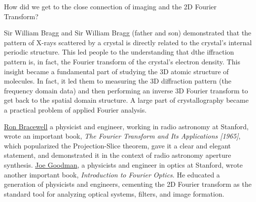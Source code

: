 \documentclass[
  letterpaper,
]{book}
\begin{document}
\begin{tcolorbox}[enhanced jigsaw, colframe=quarto-callout-note-color-frame, titlerule=0mm, rightrule=.15mm, opacitybacktitle=0.6, colback=white, leftrule=.75mm, coltitle=black, title=\textcolor{quarto-callout-note-color}{\faInfo}\hspace{0.5em}{2D Fourier Transforms}, bottomrule=.15mm, colbacktitle=quarto-callout-note-color!10!white, breakable, left=2mm, bottomtitle=1mm, toptitle=1mm, opacityback=0, arc=.35mm, toprule=.15mm]

How did we get to the close connection of imaging and the 2D Fourier
Transform?

Sir William Bragg and Sir William Bragg (father and son) demonstrated
that the pattern of X-rays scattered by a crystal is directly related to
the crystal's internal periodic structure. This led people to the
understanding that dthe iffraction pattern is, in fact, the Fourier
transform of the crystal's electron density. This insight became a
fundamental part of studying the 3D atomic structure of molecules. In
fact, it led them to measuring the 3D diffraction pattern (the frequency
domain data) and then performing an inverse 3D Fourier transform to get
back to the spatial domain structure. A large part of crystallography
became a practical problem of applied Fourier analysis.

\href{https://trees.stanford.edu/bracewell.htm}{Ron Bracewell} a
physicist and engineer, working in radio astronomy at Stanford, wrote an
important book, \emph{The Fourier Transform and Its Applications
{[}1965{]}}, which popularized the Projection-Slice
theorem\footnotemark{}, gave it a clear and elegant statement, and
demonstrated it in the context of radio astronomy aperture synthesis.
\href{https://youtu.be/Aoj-JfaXcfw?si=t3dirvqJcwU6BYH5}{Joe Goodman}, a
physicists and engineer in optics at Stanford, wrote another important
book, \emph{Introduction to Fourier Optics}. He educated a generation of
physicists and engineers, cementing the 2D Fourier transform as the
standard tool for analyzing optical systems, filters, and image
formation.

\begin{figure}[H]

\end{figure}
\end{tcolorbox}
\end{document}
